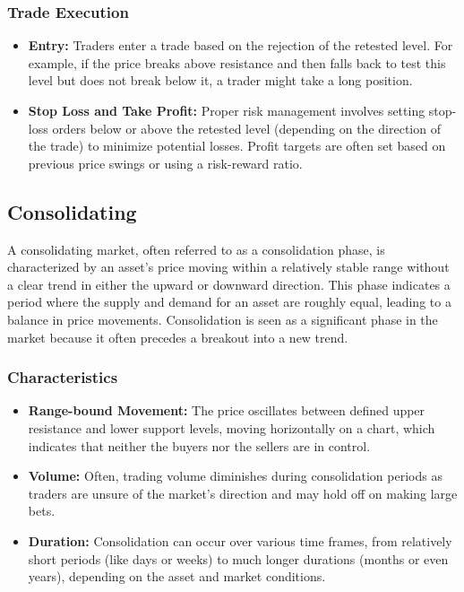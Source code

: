 \documentclass{report}
\begin{document}
    \subsubsection{Trade Execution}
    \begin{itemize}
        \item \textbf{Entry:} Traders enter a trade based on the rejection of the retested level. For example, if the price breaks above resistance and then falls back to test this level but does not break below it, a trader might take a long position.
        \item \textbf{Stop Loss and Take Profit:} Proper risk management involves setting stop-loss orders below or above the retested level (depending on the direction of the trade) to minimize potential losses. Profit targets are often set based on previous price swings or using a risk-reward ratio.
    \end{itemize}
    \bigbreak \noindent 


    \bigbreak \noindent 
    \subsection{Consolidating}
    \bigbreak \noindent 
    A consolidating market, often referred to as a consolidation phase, is characterized by an asset's price moving within a relatively stable range without a clear trend in either the upward or downward direction. This phase indicates a period where the supply and demand for an asset are roughly equal, leading to a balance in price movements. Consolidation is seen as a significant phase in the market because it often precedes a breakout into a new trend.
    \bigbreak \noindent 
    \subsubsection{Characteristics}
    \bigbreak \noindent 
    \begin{itemize}
        \item \textbf{Range-bound Movement:} The price oscillates between defined upper resistance and lower support levels, moving horizontally on a chart, which indicates that neither the buyers nor the sellers are in control.
        \item \textbf{Volume:} Often, trading volume diminishes during consolidation periods as traders are unsure of the market's direction and may hold off on making large bets.
        \item \textbf{Duration:} Consolidation can occur over various time frames, from relatively short periods (like days or weeks) to much longer durations (months or even years), depending on the asset and market conditions.
    \end{itemize}
    \bigbreak \noindent 
    \bigbreak \noindent 
    \bigbreak \noindent 
\end{document}
